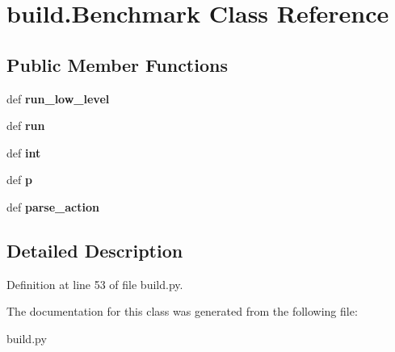 \hypertarget{classbuild_1_1Benchmark}{\section{build.\-Benchmark \-Class \-Reference}
\label{classbuild_1_1Benchmark}
}
\subsection*{\-Public \-Member \-Functions}
\begin{DoxyCompactItemize}
\item 
\hypertarget{classbuild_1_1Benchmark_aa83f3c52517967b7aaeb6ea896f03feb}{def {\bfseries run\-\_\-low\-\_\-level}}\label{classbuild_1_1Benchmark_aa83f3c52517967b7aaeb6ea896f03feb}

\item 
\hypertarget{classbuild_1_1Benchmark_aaa6c3e07a5f9853f9efa2b8057a1346d}{def {\bfseries run}}\label{classbuild_1_1Benchmark_aaa6c3e07a5f9853f9efa2b8057a1346d}

\item 
\hypertarget{classbuild_1_1Benchmark_a519134bd27acbd705050c16f593bfa82}{def {\bfseries int}}\label{classbuild_1_1Benchmark_a519134bd27acbd705050c16f593bfa82}

\item 
\hypertarget{classbuild_1_1Benchmark_a184359333daaa47e8d2dd22d8065b233}{def {\bfseries p}}\label{classbuild_1_1Benchmark_a184359333daaa47e8d2dd22d8065b233}

\item 
\hypertarget{classbuild_1_1Benchmark_a5b7c8ca2109cdd060640d95f7dab7209}{def {\bfseries parse\-\_\-action}}\label{classbuild_1_1Benchmark_a5b7c8ca2109cdd060640d95f7dab7209}

\end{DoxyCompactItemize}


\subsection{\-Detailed \-Description}


\-Definition at line 53 of file build.\-py.



\-The documentation for this class was generated from the following file\-:\begin{DoxyCompactItemize}
\item 
build.\-py\end{DoxyCompactItemize}
